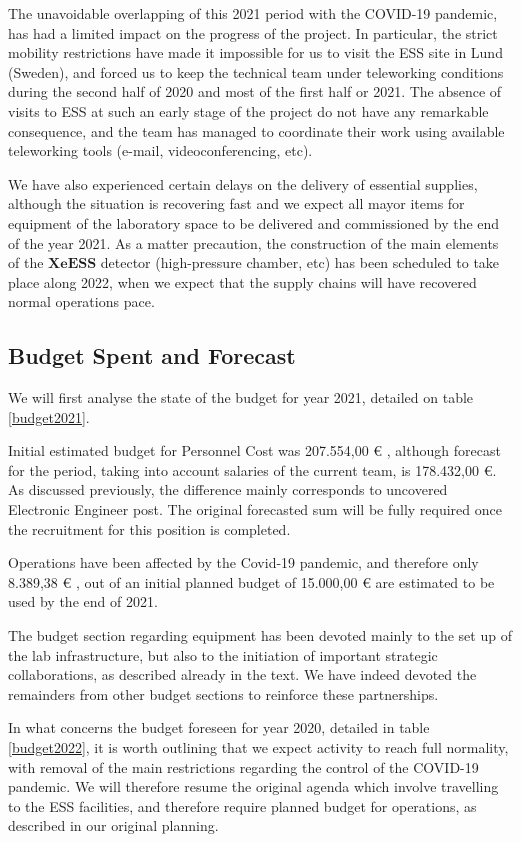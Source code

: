 \documentclass[12pt,a4paper,article]{report} %
\begin{document}
The unavoidable overlapping of this 2021 period  with the COVID-19 pandemic, has had a limited impact on the progress of the project. In particular, the strict mobility restrictions have made it impossible for us to visit the ESS site in Lund (Sweden), and forced us to keep the technical team under teleworking conditions during the second half of 2020 and most of the first half or 2021. The absence of visits to ESS at such an early stage of the project do not have any remarkable consequence, and the team has managed to coordinate their work using available teleworking tools (e-mail, videoconferencing, etc).

We have also experienced certain delays on the delivery of essential supplies, although the situation is recovering fast and we expect all mayor items for equipment of the laboratory space to be delivered and commissioned  by the end of the year 2021. As a matter precaution, the construction of the main elements of the $\mathbf{XeESS}$ detector (high-pressure chamber, etc) has been scheduled to take place along 2022, when we expect that the supply chains will have recovered normal operations pace. 

\subsection*{Budget Spent and Forecast}

We will first analyse the state of the budget for year 2021, detailed on table \ref{budget2021}. 

Initial estimated budget for Personnel Cost was  207.554,00 \euro{} , although  forecast for the period, taking into account salaries of the current team, is 178.432,00 \euro{}. As discussed previously, the difference mainly corresponds to uncovered Electronic Engineer post. The original forecasted sum will be fully required once the recruitment for this position is completed. 

Operations have been affected by the Covid-19 pandemic, and therefore only 8.389,38 \euro{} , out of an initial planned budget of 15.000,00 \euro{} are estimated to be used by the end of 2021. 

The budget section regarding equipment has been devoted mainly to the set up of the lab infrastructure, but also to the initiation of important strategic collaborations, as described already in the text. We have indeed devoted the remainders from other budget sections to reinforce these partnerships.

In what concerns the budget foreseen for year 2020, detailed in table \ref{budget2022}, it is worth outlining that we expect activity to reach full normality, with removal of the main restrictions regarding the control of the COVID-19 pandemic. We will therefore resume the original agenda which involve travelling to the ESS facilities, and therefore require planned budget for operations, as described in our original planning. 
\end{document}

